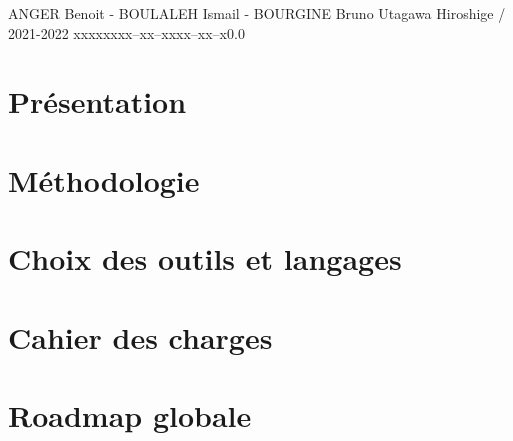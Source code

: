 \documentclass{tstextbook}
\begin{document}
       {ANGER Benoit - BOULALEH Ismail - BOURGINE Bruno}
       {Utagawa Hiroshige / }
       {2021-2022}
       {xxxxx}{xxx--xx--xxxx--xx--x}{0.0}
       {}
       {}



\chapter{Présentation}


\chapter{Méthodologie}


\chapter{Choix des outils et langages}


\chapter{Cahier des charges}


% 

\chapter{Roadmap globale}


% 

% 

% 

% 

\end{document}
